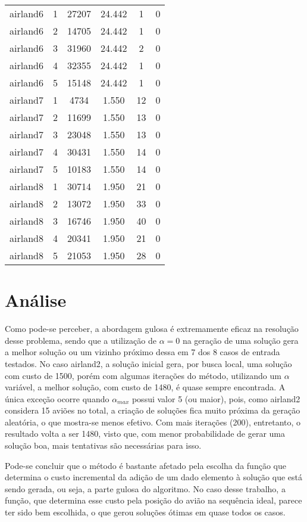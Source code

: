 \documentclass[a4paper,10pt]{abnt} %
\begin{document}
\begin{table}
\begin{tabular}{|c|c|c|c|c|c|}
\hline
airland6 & 1 & 27207 & 24.442 & 1 & 0 \\ 
airland6 & 2 & 14705 & 24.442 & 1 & 0 \\ 
airland6 & 3 & 31960 & 24.442 & 2 & 0 \\ 
airland6 & 4 & 32355 & 24.442 & 1 & 0 \\ 
airland6 & 5 & 15148 & 24.442 & 1 & 0 \\ 
\hline
airland7 & 1 & 4734 & 1.550 & 12 & 0 \\ 
airland7 & 2 & 11699 & 1.550 & 13 & 0 \\ 
airland7 & 3 & 23048 & 1.550 & 13 & 0 \\ 
airland7 & 4 & 30431 & 1.550 & 14 & 0 \\ 
airland7 & 5 & 10183 & 1.550 & 14 & 0 \\ 
\hline
airland8 & 1 & 30714 & 1.950 & 21 & 0 \\ 
airland8 & 2 & 13072 & 1.950 & 33 & 0 \\ 
airland8 & 3 & 16746 & 1.950 & 40 & 0 \\ 
airland8 & 4 & 20341 & 1.950 & 21 & 0 \\ 
airland8 & 5 & 21053 & 1.950 & 28 & 0 \\ 
\hline

\end{tabular}
\label{tab}
\end{table} 

\section{Análise} \label{Analise}

Como pode-se perceber, a abordagem gulosa é extremamente eficaz na resolução desse problema, sendo que a utilização de $\alpha = 0$ na geração de uma solução gera a melhor solução ou um vizinho próximo dessa em 7 dos 8 casos de entrada testados. No caso airland2, a solução inicial gera, por busca local, uma solução com custo de 1500, porém com algumas iterações do método, utilizando um $\alpha$ variável, a melhor solução, com custo de 1480, é quase sempre encontrada. A única exceção ocorre quando $\alpha_{max}$ possui valor 5 (ou maior), pois, como airland2 considera 15 aviões no total, a criação de soluções fica muito próxima da geração aleatória, o que mostra-se menos efetivo. Com mais iterações (200), entretanto, o resultado volta a ser 1480, visto que, com menor probabilidade de gerar uma solução boa, mais tentativas são necessárias para isso.

Pode-se concluir que o método é bastante afetado pela escolha da função que determina o custo incremental da adição de um dado elemento à solução que está sendo gerada, ou seja, a parte gulosa do algoritmo. No caso desse trabalho, a função, que determina esse custo pela posição do avião na sequência ideal, parece ter sido bem escolhida, o que gerou soluções ótimas em quase todos os casos.
\end{document}
